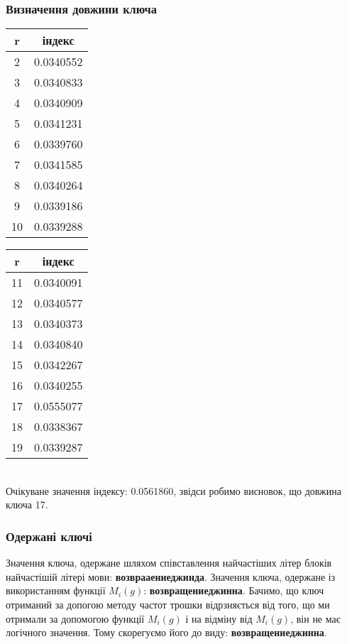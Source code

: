 \documentclass[12pt]{article}
\begin{document}
\subsubsection{Визначення довжини ключа}
\noindent
\begin{minipage}{0.5\textwidth}
    \centering
    \begin{tabular}{cc}
    \toprule
    r & індекс \\
    \midrule
    2 &  0.0340552 \\
    3 &  0.0340833 \\
    4 &  0.0340909 \\
    5 &  0.0341231 \\
    6 &  0.0339760 \\
    7 &  0.0341585 \\
    8 &  0.0340264 \\
    9 &  0.0339186 \\
    10 & 0.0339288 \\
    \bottomrule
    \end{tabular}
\end{minipage}%
\begin{minipage}{0.5\textwidth}
    \centering
    \begin{tabular}{cc}
    \toprule
    r & індекс \\
    \midrule
    11 & 0.0340091 \\
    12 & 0.0340577 \\
    13 & 0.0340373 \\
    14 & 0.0340840 \\
    15 & 0.0342267 \\
    16 & 0.0340255 \\
    17 & 0.0555077 \\
    18 & 0.0338367 \\
    19 & 0.0339287 \\
    \bottomrule
    \end{tabular}
\end{minipage} \\
    
\quad Очікуване значення індексу: 0.0561860, звідси робимо висновок, що довжина ключа 17.
    
\subsubsection{Одержані ключі}
\quad Значення ключа, одержане шляхом співставлення найчастіших літер блоків
найчастішій літері мови: \textbf{возврааениеджинда}. Значення ключа, одержане із використанням функції $M_i(g)$: \textbf{возвращениеджинна}. Бачимо, що ключ отриманий за допогою методу частот трошки відрзняється від того, що ми отримали за допомогою функції $M_i(g)$ і на відміну від $M_i(g)$, він не має логічного значення. Тому скорегуємо його до виду: \textbf{возвращениеджинна}.\\
    
\end{document}
